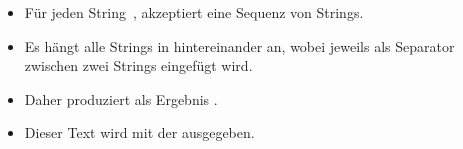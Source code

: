 \documentclass[aspectratio=169,mathserif,notheorems]{beamer}%
\begin{document}
\begin{frame}[t]
{{\begin{itemize}
{}%
%
\item<49-> Für jeden String~, akzeptiert  eine Sequenz  von Strings.%
%
\item<50-> Es hängt alle Strings in  hintereinander an, wobei jeweils  als Separator zwischen zwei Strings eingefügt wird.%
%
\item<51-> Daher produziert  als Ergebnis  .%
%
\item<52-> Dieser Text wird mit der  ausgegeben.%
\end{itemize}%
}}%
%
%
%
%
\end{frame}%
%
\end{document}
